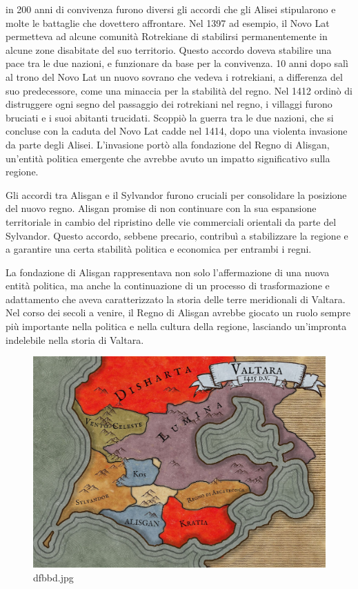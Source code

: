 in 200 anni di convivenza furono diversi gli accordi che gli Alisei
stipularono e molte le battaglie che dovettero affrontare. Nel 1397 ad
esempio, il Novo Lat permetteva ad alcune comunità Rotrekiane di
stabilirsi permanentemente in alcune zone disabitate del suo territorio.
Questo accordo doveva stabilire una pace tra le due nazioni, e
funzionare da base per la convivenza. 10 anni dopo salì al trono del
Novo Lat un nuovo sovrano che vedeva i rotrekiani, a differenza del suo
predecessore, come una minaccia per la stabilità del regno. Nel 1412
ordinò di distruggere ogni segno del passaggio dei rotrekiani nel regno,
i villaggi furono bruciati e i suoi abitanti trucidati. Scoppiò la
guerra tra le due nazioni, che si concluse con la caduta del Novo Lat
cadde nel 1414, dopo una violenta invasione da parte degli Alisei.
L'invasione portò alla fondazione del Regno di Alisgan, un'entità
politica emergente che avrebbe avuto un impatto significativo sulla
regione.

Gli accordi tra Alisgan e il Sylvandor furono cruciali per consolidare
la posizione del nuovo regno. Alisgan promise di non continuare con la
sua espansione territoriale in cambio del ripristino delle vie
commerciali orientali da parte del Sylvandor. Questo accordo, sebbene
precario, contribuì a stabilizzare la regione e a garantire una certa
stabilità politica e economica per entrambi i regni.

La fondazione di Alisgan rappresentava non solo l'affermazione di una
nuova entità politica, ma anche la continuazione di un processo di
trasformazione e adattamento che aveva caratterizzato la storia delle
terre meridionali di Valtara. Nel corso dei secoli a venire, il Regno di
Alisgan avrebbe giocato un ruolo sempre più importante nella politica e
nella cultura della regione, lasciando un'impronta indelebile nella
storia di Valtara.

\begin{figure}
\centering
\includegraphics{dfbbd.jpg}
\caption{dfbbd.jpg}
\end{figure}

